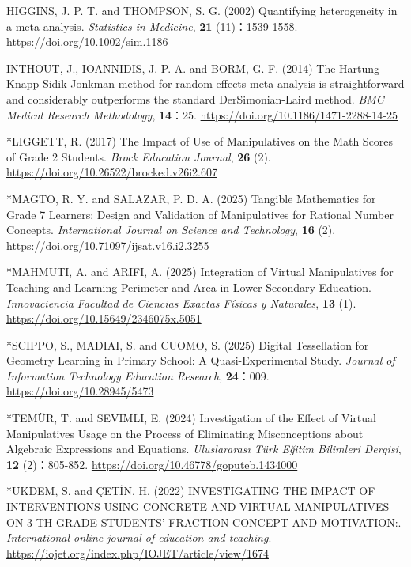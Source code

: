 \documentclass[
  lualatex, ja=standard, paper={182mm,257mm}, twocolumn, fontsize=8.5pt, baselineskip=13.5pt,
  line_length=24zw, column_gap=6.1mm, number_of_lines=45, head_space=24.5mm, gutter=16.25mm
]{jlreq}
\begin{document}
{\par\noindent{}\zw{} HIGGINS, J. P. T. and THOMPSON, S. G. (2002) Quantifying heterogeneity in a meta-analysis. \textit{Statistics in Medicine}, \textbf{21} (11)：1539-1558. \url{https://doi.org/10.1002/sim.1186}\par
\par\noindent{}\zw{} INTHOUT, J., IOANNIDIS, J. P. A. and BORM, G. F. (2014) The Hartung-Knapp-Sidik-Jonkman method for random effects meta-analysis is straightforward and considerably outperforms the standard DerSimonian-Laird method. \textit{BMC Medical Research Methodology}, \textbf{14}：25. \url{https://doi.org/10.1186/1471-2288-14-25}\par
\par\noindent{}\zw{} *LIGGETT, R. (2017) The Impact of Use of Manipulatives on the Math Scores of Grade 2 Students. \textit{Brock Education Journal}, \textbf{26} (2). \url{https://doi.org/10.26522/brocked.v26i2.607}\par
\par\noindent{}\zw{} *MAGTO, R. Y. and SALAZAR, P.  D. A. (2025) Tangible Mathematics for Grade 7 Learners: Design and Validation of Manipulatives for Rational Number Concepts. \textit{International Journal on Science and Technology}, \textbf{16} (2). \url{https://doi.org/10.71097/ijsat.v16.i2.3255}\par
\par\noindent{}\zw{} *MAHMUTI, A. and ARIFI, A. (2025) Integration of Virtual Manipulatives for Teaching and Learning Perimeter and Area in Lower Secondary Education. \textit{Innovaciencia Facultad de Ciencias Exactas Físicas y Naturales}, \textbf{13} (1). \url{https://doi.org/10.15649/2346075x.5051}\par
\par\noindent{}\zw{} *SCIPPO, S., MADIAI, S. and CUOMO, S. (2025) Digital Tessellation for Geometry Learning in Primary School: A Quasi-Experimental Study. \textit{Journal of Information Technology Education Research}, \textbf{24}：009. \url{https://doi.org/10.28945/5473}\par
\par\noindent{}\zw{} *TEMÜR, T. and SEVIMLI, E. (2024) Investigation of the Effect of Virtual Manipulatives Usage on the Process of Eliminating Misconceptions about Algebraic Expressions and Equations. \textit{Uluslararası Türk Eğitim Bilimleri Dergisi}, \textbf{12} (2)：805-852. \url{https://doi.org/10.46778/goputeb.1434000}\par
\par\noindent{}\zw{} *UKDEM, S. and ÇETİN, H. (2022) INVESTIGATING THE IMPACT OF INTERVENTIONS USING CONCRETE AND VIRTUAL MANIPULATIVES ON 3 TH GRADE STUDENTS' FRACTION CONCEPT AND MOTIVATION:. \textit{International online journal of education and teaching}. \url{https://iojet.org/index.php/IOJET/article/view/1674}\par
}
\end{document}

